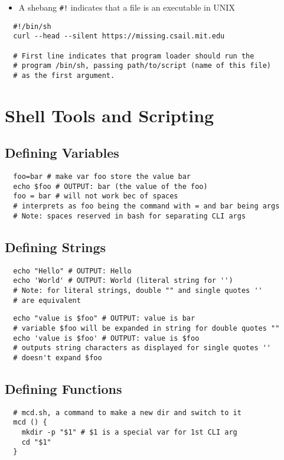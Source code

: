 \documentclass[letterpaper,12pt]{article}
\begin{document}
\begin{itemize}
 \item A shebang \lstinline{#!} indicates that a file is an executable in UNIX
\end{itemize}

\begin{lstlisting}
  #!/bin/sh
  curl --head --silent https://missing.csail.mit.edu

  # First line indicates that program loader should run the
  # program /bin/sh, passing path/to/script (name of this file)
  # as the first argument.
\end{lstlisting}

\section{Shell Tools and Scripting}

\subsection{Defining Variables}

\begin{lstlisting}
  foo=bar # make var foo store the value bar
  echo $foo # OUTPUT: bar (the value of the foo)
  foo = bar # will not work bec of spaces
  # interprets as foo being the command with = and bar being args
  # Note: spaces reserved in bash for separating CLI args
\end{lstlisting}

\subsection{Defining Strings}

\begin{lstlisting}
  echo "Hello" # OUTPUT: Hello
  echo 'World' # OUTPUT: World (literal string for '')
  # Note: for literal strings, double "" and single quotes ''
  # are equivalent
\end{lstlisting}

\begin{lstlisting}
  echo "value is $foo" # OUTPUT: value is bar
  # variable $foo will be expanded in string for double quotes ""
  echo 'value is $foo' # OUTPUT: value is $foo
  # outputs string characters as displayed for single quotes ''
  # doesn't expand $foo
\end{lstlisting}

\subsection{Defining Functions}
\begin{lstlisting}
  # mcd.sh, a command to make a new dir and switch to it
  mcd () {
    mkdir -p "$1" # $1 is a special var for 1st CLI arg
    cd "$1"
  }
\end{lstlisting}
\end{document}
